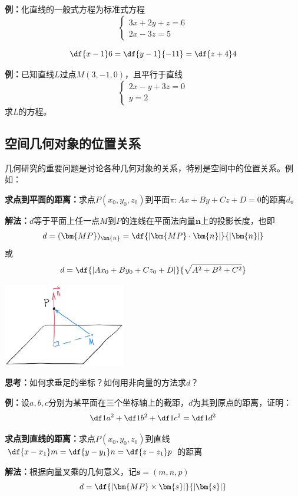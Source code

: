 {\bf 例：}化直线的一般式方程为标准式方程
$$\left\{\begin{array}{l}
	3x+2y+z=6\\
	2x-3z=5
\end{array}\right.$$

$$\df{x-1}6=\df{y-1}{-11}=\df{z+4}4$$

{\bf 例：}已知直线$L$过点$M(3,-1,0)$，且平行于直线
$$\left\{\begin{array}{l}
	2x-y+3z=0\\
	y=2
\end{array}\right.$$
求$L$的方程。

\subsection{空间几何对象的位置关系}

几何研究的重要问题是讨论各种几何对象的关系，特别是空间中的位置关系。例如：

\begin{thx}
	{\bf 求点到平面的距离：}求点$P(x_0,y_0,z_0)$到平面$\pi:Ax+By+Cz+D=0$的距离$d$。

	{\bf 解法：}$d$等于平面上任一点$M$到$P$的连线在平面法向量$\bm{n}$上的投影长度，也即 
	$$d=(\bm{MP})_{\bm{n}}=\df{|\bm{MP}\cdot\bm{n}|}{|\bm{n}|}$$ 
	或
	$${d=\df{|Ax_0+By_0+Cz_0+D|}{\sqrt{A^2+B^2+C^2}}}$$
\end{thx}

\begin{center}
	\includegraphics[width=0.4\textwidth]{./images/ch8/ppd.jpg}
\end{center}

{\bf 思考：}如何求垂足的坐标？如何用非向量的方法求$d$？

{\bf 例：}设$a,b,c$分别为某平面在三个坐标轴上的截距，$d$为其到原点的距离，证明：
$$\df1{a^2}+\df1{b^2}+\df1{c^2}=\df1{d^2}$$

\begin{thx}
	{\bf 求点到直线的距离：}求点$P(x_0,y_0,z_0)$到直线$\df{x-x_1}m=\df{y-y_1}n=\df{z-z_1}p$
	的距离
	
	{\bf 解法：}根据向量叉乘的几何意义，记$\bm{s}=(m,n,p)$
	$$d=\df{|\bm{MP}\times\bm{s}|}{|\bm{s}|}$$
\end{thx}


